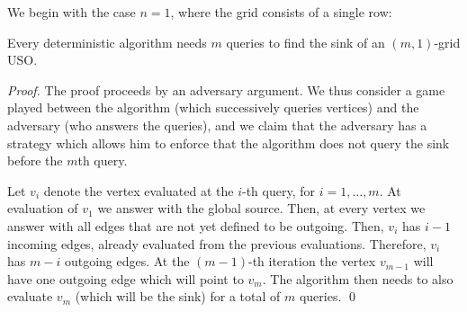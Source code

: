 \documentclass[runningheads,a4paper]{llncs}
\begin{document}
We begin with the case $n=1$, where the grid consists of a single row:

\begin{lemma}\label{lem:kx1}
Every deterministic algorithm needs $m$ queries to find the sink of an $(m,1)$-grid USO.
\end{lemma}
\begin{proof}
    The proof proceeds by an adversary argument.
    We thus consider a game played between the algorithm (which successively
    queries vertices) and the adversary (who answers the queries),
    and we claim that the adversary has a strategy which allows him to enforce
    that the algorithm does not query the sink before the $m$th query.

Let $v_i$ denote the vertex evaluated at the $i$-th query, for $i=1,\ldots, m$. At evaluation of $v_1$ we answer with the global source. Then, at every vertex
we answer with all edges that are not yet defined to be outgoing. Then, $v_i$ has $i-1$ incoming edges, already evaluated from the previous evaluations. 
Therefore, $v_i$ has $m-i$ outgoing edges. At the $(m-1)$-th iteration the vertex $v_{m-1}$ will have one outgoing edge which will point to $v_m$.
The algorithm then needs to also evaluate $v_m$ (which will be the sink) for a total of $m$ queries. \qed 
\end{proof}
\end{document}
